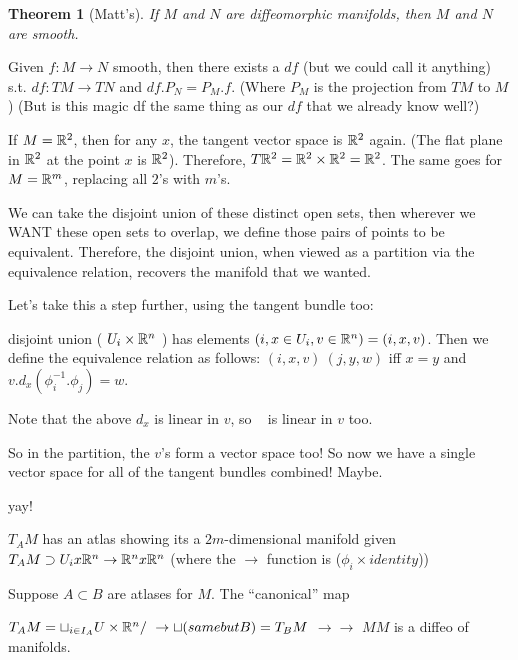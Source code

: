 \documentclass[11pt,leqno,oneside]{amsart}
\newenvironment{dateenv}{
	\vspace{1em}
}{
	\vspace{1em}
}
\newcommand{\mydate}[4]{
	\newdate{#1}{#2}{#3}{#4}
	\begin{dateenv}
		\hfill\displaydate{#1}
	\end{dateenv}
}
\theoremstyle{mystyle} \newtheorem{thrm}[thm]{Theorem}
\theoremstyle{mystyle} \newtheorem{defi}[thm]{Definition}
\begin{document}
\begin{thrm}[Matt's]
	If $M$ and $N$ are diffeomorphic manifolds, then $M$ and $N$ are smooth.
\end{thrm}


\mydate{d1}{21}{9}{2016}

Given $f:M \to N$ smooth, then there exists a $df$ (but we could call it anything) s.t. $df : TM \to TN$ and $df.P_N = P_M.f$.  (Where $P_M$ is the projection from $TM$ to $M$)  (But is this magic df the same thing as our $df$ that we already know well?)

\begin{example}
	If $M = {\mathbb R}^2$, then for any $x$, the tangent vector space is ${\mathbb R}^2$ again.  (The flat plane in ${\mathbb R}^2$ at the point $x$ is ${\mathbb R}^2$).  Therefore, $T{\mathbb R}^2 = {\mathbb R}^2 \times {\mathbb R}^2 = {\mathbb R}^2$.  The same goes for $M = {\mathbb R}^m$, replacing all $2$'s with $m$'s.
\end{example}

We can take the disjoint union of these distinct open sets, then wherever we WANT these open sets to overlap, we define those pairs of points to be equivalent.  Therefore, the disjoint union, when viewed as a partition via the equivalence relation, recovers the manifold that we wanted.

Let's take this a step further, using the tangent bundle too:

disjoint union ( $U_i \times {\mathbb R}^n$ ) has elements $(i, x \in U_i, v \in {\mathbb R}^n) = (i, x, v)$.
Then we define the equivalence relation as follows:
$(i, x, v) ~ (j, y, w)$ iff $x=y$ and $v.d_x(\phi_i^{-1}.\phi_j) = w$.

Note that the above $d_x$ is linear in $v$, so ~ is linear in $v$ too.

So in the partition, the $v$'s form a vector space too!  So now we have a single vector space for all of the tangent bundles combined!  Maybe.

yay!

\begin{lem}
	$T_A M$ has an atlas showing its a $2m$-dimensional manifold given
	$T_A M \supset U_i x {\mathbb R}^n \to {\mathbb R}^n x {\mathbb R}^n$ (where the $\to$ function is ($\phi_i \times identity$))
\end{lem}
\begin{cor}
	Suppose $A \subset B$ are atlases for $M$.  The ``canonical'' map

	$T_A M = \sqcup_{i \in I_A} U \times {\mathbb R}^n/~ \to \sqcup (same but B) = T_B M$
				$\to										\to$
				$M 										M$
	is a diffeo of manifolds.
\end{cor}
\end{document}

